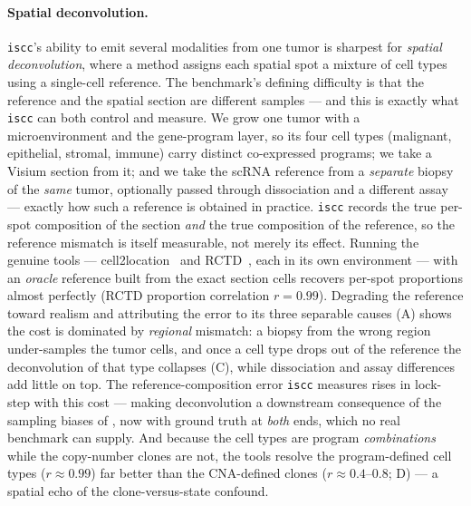 \documentclass{article}
\begin{document}
\paragraph{Spatial deconvolution.}
\texttt{iscc}'s ability to emit several modalities from one tumor is sharpest for \emph{spatial
deconvolution}, where a method assigns each spatial spot a mixture of cell types using a single-cell
reference. The benchmark's defining difficulty is that the reference and the spatial section are
different samples --- and this is exactly what \texttt{iscc} can both control and measure. We grow one
tumor with a microenvironment and the gene-program layer, so its four cell types (malignant, epithelial,
stromal, immune) carry distinct co-expressed programs; we take a Visium section from it; and we take the
scRNA reference from a \emph{separate} biopsy of the \emph{same} tumor, optionally passed through
dissociation and a different assay --- exactly how such a reference is obtained in practice. \texttt{iscc}
records the true per-spot composition of the section \emph{and} the true composition of the reference, so
the reference mismatch is itself measurable, not merely its effect. Running the genuine tools ---
cell2location~\cite{kleshchevnikov_cell2location_2022} and RCTD~\cite{cable_rctd_2022}, each in its own
environment --- with an \emph{oracle} reference built from the exact section cells recovers per-spot
proportions almost perfectly (RCTD proportion correlation $r=0.99$). Degrading the reference toward
realism and attributing the error to its three separable causes (A) shows the cost is
dominated by \emph{regional} mismatch: a biopsy from the wrong region under-samples the tumor cells, and
once a cell type drops out of the reference the deconvolution of that type collapses (C),
while dissociation and assay differences add little on top. The reference-composition error \texttt{iscc}
measures rises in lock-step with this cost --- making deconvolution a downstream consequence of the
sampling biases of , now with ground truth at \emph{both} ends, which no real
benchmark can supply. And because the cell types are program \emph{combinations} while the copy-number
clones are not, the tools resolve the program-defined cell types ($r\approx0.99$) far better than the
CNA-defined clones ($r\approx0.4$--$0.8$; D) --- a spatial echo of the clone-versus-state
confound.
\end{document}
